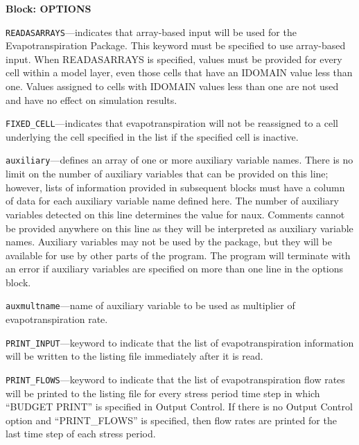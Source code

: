 
\item \textbf{Block: OPTIONS}

\begin{description}
\item \texttt{READASARRAYS}---indicates that array-based input will be used for the Evapotranspiration Package.  This keyword must be specified to use array-based input.  When READASARRAYS is specified, values must be provided for every cell within a model layer, even those cells that have an IDOMAIN value less than one.  Values assigned to cells with IDOMAIN values less than one are not used and have no effect on simulation results.

\item \texttt{FIXED\_CELL}---indicates that evapotranspiration will not be reassigned to a cell underlying the cell specified in the list if the specified cell is inactive.

\item \texttt{auxiliary}---defines an array of one or more auxiliary variable names.  There is no limit on the number of auxiliary variables that can be provided on this line; however, lists of information provided in subsequent blocks must have a column of data for each auxiliary variable name defined here.   The number of auxiliary variables detected on this line determines the value for naux.  Comments cannot be provided anywhere on this line as they will be interpreted as auxiliary variable names.  Auxiliary variables may not be used by the package, but they will be available for use by other parts of the program.  The program will terminate with an error if auxiliary variables are specified on more than one line in the options block.

\item \texttt{auxmultname}---name of auxiliary variable to be used as multiplier of evapotranspiration rate.

\item \texttt{PRINT\_INPUT}---keyword to indicate that the list of evapotranspiration information will be written to the listing file immediately after it is read.

\item \texttt{PRINT\_FLOWS}---keyword to indicate that the list of evapotranspiration flow rates will be printed to the listing file for every stress period time step in which ``BUDGET PRINT'' is specified in Output Control.  If there is no Output Control option and ``PRINT\_FLOWS'' is specified, then flow rates are printed for the last time step of each stress period.


\end{description}
